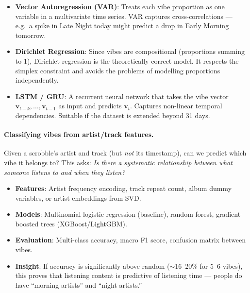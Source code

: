 \documentclass[12pt, a4paper]{article}
\begin{document}
\begin{itemize}
    \item \textbf{Vector Autoregression (VAR)}: Treats each vibe proportion
          as one variable in a multivariate time series. VAR captures
          cross-correlations --- e.g.\ a spike in Late Night today might
          predict a drop in Early Morning tomorrow.
    \item \textbf{Dirichlet Regression}: Since vibes are compositional
          (proportions summing to 1), Dirichlet regression is the
          theoretically correct model. It respects the simplex constraint
          and avoids the problems of modelling proportions independently.
    \item \textbf{LSTM / GRU}: A recurrent neural network that takes the
          vibe vector $\mathbf{v}_{t-k}, \ldots, \mathbf{v}_{t-1}$ as input
          and predicts $\mathbf{v}_t$. Captures non-linear temporal
          dependencies. Suitable if the dataset is extended beyond 31 days.
\end{itemize}

\paragraph{Classifying vibes from artist/track features.}
Given a scrobble's artist and track (but \emph{not} its timestamp), can we
predict which vibe it belongs to? This asks: \emph{Is there a systematic
relationship between what someone listens to and when they listen?}

\begin{itemize}
    \item \textbf{Features}: Artist frequency encoding, track repeat count,
          album dummy variables, or artist embeddings from SVD.
    \item \textbf{Models}: Multinomial logistic regression (baseline),
          random forest, gradient-boosted trees (XGBoost/LightGBM).
    \item \textbf{Evaluation}: Multi-class accuracy, macro F1 score,
          confusion matrix between vibes.
    \item \textbf{Insight}: If accuracy is significantly above random
          ($\sim$16--20\% for 5--6 vibes), this proves that listening
          content is predictive of listening time --- people do have
          ``morning artists'' and ``night artists.''
\end{itemize}


\end{document}
